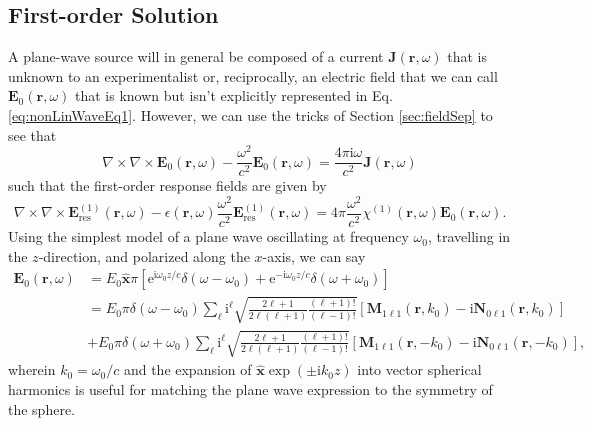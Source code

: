 \documentclass{article}
\begin{document}
\subsection{First-order Solution}\label{sec:firstOrderSolution}

A plane-wave source will in general be composed of a current $\mathbf{J}(\mathbf{r},\omega)$ that is unknown to an experimentalist or, reciprocally, an electric field that we can call $\mathbf{E}_0(\mathbf{r},\omega)$ that is known but isn't explicitly represented in Eq. \ref{eq:nonLinWaveEq1}. However, we can use the tricks of Section \ref{sec:fieldSep} to see that
\begin{equation}
\nabla\times\nabla\times\mathbf{E}_0(\mathbf{r},\omega) - \frac{\omega^2}{c^2}\mathbf{E}_0(\mathbf{r},\omega) = \frac{4\pi\mathrm{i}\omega}{c^2}\mathbf{J}(\mathbf{r},\omega)
\end{equation}
such that the first-order response fields are given by
\begin{equation}
\nabla\times\nabla\times\mathbf{E}^{(1)}_\mathrm{res}(\mathbf{r},\omega) - \epsilon(\mathbf{r},\omega)\frac{\omega^2}{c^2}\mathbf{E}^{(1)}_\mathrm{res}(\mathbf{r},\omega) = 4\pi\frac{\omega^2}{c^2}\chi^{(1)}(\mathbf{r},\omega)\mathbf{E}_0(\mathbf{r},\omega).
\end{equation}
Using the simplest model of a plane wave oscillating at frequency $\omega_0$, travelling in the $z$-direction, and polarized along the $x$-axis, we can say
\begin{equation}
\begin{split}
\mathbf{E}_0(\mathbf{r},\omega) &= E_0\hat{\mathbf{x}}\pi\left[\mathrm{e}^{\mathrm{i}\omega_0z/c}\delta(\omega - \omega_0) + \mathrm{e}^{-\mathrm{i}\omega_0z/c}\delta(\omega + \omega_0)\right]\\[1.0em]
&= E_0\pi\delta(\omega - \omega_0)\sum_\ell\mathrm{i}^\ell\sqrt{\frac{2\ell + 1}{2\ell(\ell + 1)}\frac{(\ell + 1)!}{(\ell - 1)!}}\left[\mathbf{M}_{1\ell1}(\mathbf{r},k_0) - \mathrm{i}\mathbf{N}_{0\ell1}(\mathbf{r},k_0)\right]\\
&+ E_0\pi\delta(\omega + \omega_0)\sum_\ell\mathrm{i}^\ell\sqrt{\frac{2\ell + 1}{2\ell(\ell + 1)}\frac{(\ell + 1)!}{(\ell - 1)!}}\left[\mathbf{M}_{1\ell1}(\mathbf{r},-k_0) - \mathrm{i}\mathbf{N}_{0\ell1}(\mathbf{r},-k_0)\right],
\end{split}
\end{equation}
wherein $k_0 = \omega_0/c$ and the expansion of $\hat{\mathbf{x}}\exp(\pm\mathrm{i}k_0z)$ into vector spherical harmonics is useful for matching the plane wave expression to the symmetry of the sphere.
\end{document}
